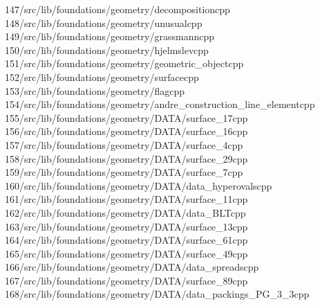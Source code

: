 \begin{tabbing}
147\>/src/lib/foundations/geometry/decompositioncpp\\[0pt]
148\>/src/lib/foundations/geometry/unusualcpp\\[0pt]
149\>/src/lib/foundations/geometry/grassmanncpp\\[0pt]
150\>/src/lib/foundations/geometry/hjelmslevcpp\\[0pt]
151\>/src/lib/foundations/geometry/geometric\_objectcpp\\[0pt]
152\>/src/lib/foundations/geometry/surfacecpp\\[0pt]
153\>/src/lib/foundations/geometry/flagcpp\\[0pt]
154\>/src/lib/foundations/geometry/andre\_construction\_line\_elementcpp\\[0pt]
155\>/src/lib/foundations/geometry/DATA/surface\_17cpp\\[0pt]
156\>/src/lib/foundations/geometry/DATA/surface\_16cpp\\[0pt]
157\>/src/lib/foundations/geometry/DATA/surface\_4cpp\\[0pt]
158\>/src/lib/foundations/geometry/DATA/surface\_29cpp\\[0pt]
159\>/src/lib/foundations/geometry/DATA/surface\_7cpp\\[0pt]
160\>/src/lib/foundations/geometry/DATA/data\_hyperovalscpp\\[0pt]
161\>/src/lib/foundations/geometry/DATA/surface\_11cpp\\[0pt]
162\>/src/lib/foundations/geometry/DATA/data\_BLTcpp\\[0pt]
163\>/src/lib/foundations/geometry/DATA/surface\_13cpp\\[0pt]
164\>/src/lib/foundations/geometry/DATA/surface\_61cpp\\[0pt]
165\>/src/lib/foundations/geometry/DATA/surface\_49cpp\\[0pt]
166\>/src/lib/foundations/geometry/DATA/data\_spreadscpp\\[0pt]
167\>/src/lib/foundations/geometry/DATA/surface\_89cpp\\[0pt]
168\>/src/lib/foundations/geometry/DATA/data\_packings\_PG\_3\_3cpp\\[0pt]

\end{tabbing}
